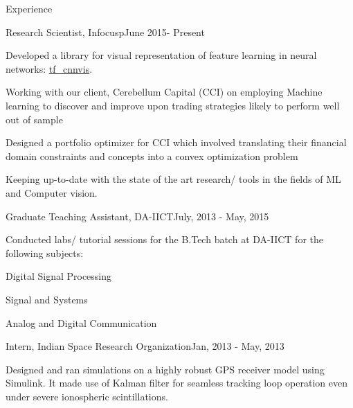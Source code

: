 \documentclass{resume} %
\begin{document}
	
	\begin{rSection}{Experience}
		
		\begin{rSubsection}{Research Scientist, Infocusp}{June 2015- Present}{}{}
			\item Developed a library for visual representation of feature learning  in neural networks: \href{https://github.com/InFoCusp/tf_cnnvis}{tf\_cnnvis}.
			\item Working with our client, Cerebellum Capital (CCI) on employing Machine learning to discover and improve upon trading strategies likely to perform well out of sample
			\item Designed a portfolio optimizer for CCI which involved translating their financial domain constraints and concepts into a convex optimization problem
			\item Keeping up-to-date with the state of the art research/ tools in the fields of ML and Computer vision.

		\end{rSubsection}
		
		
		
		\begin{rSubsection}{Graduate Teaching Assistant, DA-IICT}{July, 2013 - May, 2015}{}{}
			\item Conducted labs/ tutorial sessions for the B.Tech batch at DA-IICT for the following subjects:
			\item Digital Signal Processing 
			\item Signal and Systems
			\item Analog and Digital Communication
		\end{rSubsection}
		
			\begin{rSubsection}{Intern, Indian Space Research Organization}{Jan, 2013 - May, 2013}{}{}
				\item Designed and ran simulations on a highly robust GPS receiver model using Simulink. It made use of Kalman filter for seamless tracking loop operation even under severe ionospheric scintillations. 
			\end{rSubsection}
	\end{rSection}
	
\end{document}
